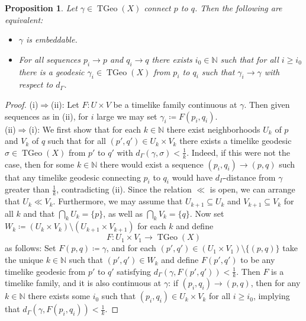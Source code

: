 \documentclass[a4paper,11pt]{article}
\numberwithin{equation}{section}
\theoremstyle{plain}
\newtheorem{Proposition}[Definition]{Proposition}
\theoremstyle{definition}
\newcommand{\N}{\mathbb N}
\DeclareMathOperator{\TGeo}{TGeo}
\begin{document}
\begin{Proposition}\label{prop:embed-char}
Let $\gamma\in \TGeo(X)$ connect $p$ to $q$. Then the following are equivalent:
\begin{itemize}
\item[(i)] $\gamma$ is embeddable.
\item[(ii)] For all sequences $p_i\to p$ and $q_i\to q$ there exists $i_0\in \N$ such that for all $i\ge i_0$ there is a geodesic $\gamma_i\in \TGeo(X)$ from $p_i$ to $q_i$ such that 
$\gamma_i\to \gamma$ with respect to $d_\Gamma$.
\end{itemize}
\end{Proposition}
\begin{proof}
(i)$\Rightarrow$(ii): Let $F \colon U \times V$ be a timelike family continuous at $\gamma$. Then given sequences as in (ii), for $i$ large
we may set $\gamma_i \coloneqq F(p_i,q_i)$. \\
(ii)$\Rightarrow$(i): We first show that for each $k\in \N$ there exist neighborhoods $U_k$ of $p$ and $V_k$ of $q$ such that for all $(p',q')\in U_k\times V_k$ there exists a timelike geodesic $\sigma\in \TGeo(X)$ from $p'$ to $q'$ with $d_\Gamma(\gamma,\sigma)<\frac{1}{k}$. Indeed, if this were not the case, then for some $k\in \N$ there would exist a sequence $(p_i,q_i)\to (p,q)$ such that
any timelike geodesic connecting $p_i$ to $q_i$ would have $d_\Gamma$-distance from $\gamma$ greater than $\frac{1}{k}$, contradicting (ii).
Since the relation $\ll$ is open, we can arrange that $U_k\ll V_k$. Furthermore, we may assume that $U_{k+1}\subseteq U_k$ and $V_{k+1}\subseteq V_k$ for all $k$ and that $\bigcap_k U_k = \{p\}$, as well as $\bigcap_k V_k = \{q\}$. Now set $W_k \coloneqq (U_k\times V_k)\setminus (U_{k+1}\times V_{k+1})$ for each $k$ and define 
\[
F \colon U_1 \times V_1 \to \TGeo(X)
\]
as follows: Set $F(p,q) \coloneqq \gamma$, and for each $(p',q')\in (U_1\times V_1)\setminus \{(p,q)\}$ take the unique
$k\in \N$ such that $(p',q')\in W_k$ and define $F(p',q')$ to be any timelike geodesic from $p'$ to $q'$ satisfying $d_\Gamma(\gamma,F(p',q'))<\frac{1}{k}$. Then $F$ is a timelike family, and it is also continuous at $\gamma$: if $(p_i,q_i)\to (p,q)$, then for any $k\in \N$ there exists some $i_0$
such that $(p_i,q_i)\in U_k\times V_k$ for all $i\ge i_0$, implying that $d_\Gamma(\gamma,F(p_i,q_i))<\frac{1}{k}$.
\end{proof}
\end{document}
